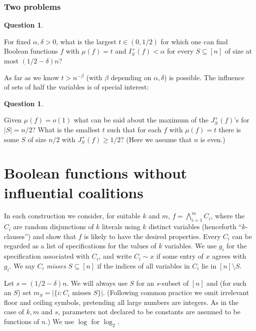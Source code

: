\documentclass[11pt]{article}
\numberwithin{equation}{section}
\theoremstyle{definition}
\newtheorem{question}[theorem]{Question}
\theoremstyle{plain}
\newcommand{\nin}[0]{\noindent}
\newcommand{\sub}[0]{\subseteq}
\newcommand{\sm}[0]{\setminus}
\newcommand{\0}[0]{\emptyset}
\newcommand{\ga}[0]{\alpha }
\newcommand{\gb}[0]{\beta }
\newcommand{\gd}[0]{\delta }
\begin{document}
%
%
%
%
%
%
%
%
%
%
%
%
%
%

%


\subsubsection* {Two problems}


\begin{question}\label{prop4}

For fixed $\alpha,\delta >0$, what is
the largest $t\in (0,1/2)$ for which one can find
Boolean functions $f$ with $\mu(f) =t$ and
$I^+_S(f)<\ga$ for every $S\sub [n]$ of size
at most %
$(1/2-\gd)n$?
\end{question}

\nin
As far as we know $t> n^{-\gb}$ (with $\gb$ depending on $\ga,\gd$)
is possible. The influence of sets of half the variables is of special interest:

\begin{question}\label{prop5}

Given $\mu(f) =o(1)$ what can be said about 
the maximum of
the   %
$J_S^+(f)$'s for $|S|=n/2$?  %
What is the smallest $t$ 
such that for each $f$ with $\mu(f) =t$ there is some
$S$ of size $n/2$ with $J_S^+(f) \ge 1/2 ?$
(Here we assume that $n$ is even.)  %
\end{question}



\section{Boolean functions without influential coalitions}
\label{examples}


In each construction we consider, for suitable $k$ and $m$,
%
$f= \bigwedge_{i=1}^m C_i$, where the  %
%
$C_i$   %
%
%
%
are random %
disjunctions  %
of $k$ literals
using $k$ distinct variables (henceforth ``$k$-clauses'')
and show that $f$ is likely to have the desired properties. 
Every $C_i$ can be regarded as a list of specifications for 
the values of $k$ variables.
We use $g_i$ for the specification associated with $C_i$,
and write $C_i\sim x$ if some entry of $x$ agrees with $g_i$.
We say $C_i$ \emph{misses} $S\sub [n]$ if the indices of all
variables in $C_i$ lie in $[n]\sm S$.


Let $s= (1/2-\gd)n$.  %
We will always
use $S$ for an $s$-subset of $[n]$ and
(for such an $S$) set
$m_S=|\{i:\mbox{$C_i$ misses $S$}\}|.$
(Following common practice we omit irrelevant
floor and ceiling symbols,
pretending all large numbers are integers.
As in the case of $k,m$ and $s$, parameters not declared
to be constants are assumed to be functions of $n$.)
We use $\log$ for $\log_2$.
\end{document}
